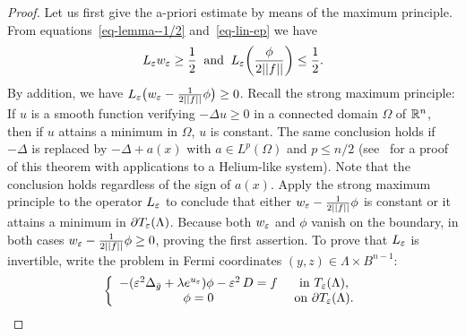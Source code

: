 \begin{proof} Let us first give the a-priori estimate by means of the maximum
    principle. From equations~\ref{eq-lemma--1/2} and~\ref{eq-lin-ep} we have
    \begin{equation}
        L_\varepsilon w_\varepsilon \geq \frac{1}{2}\;\;\mbox{and}\;\;
        L_\varepsilon\bigg(\frac{\phi}{2||f||}\bigg)\leq \frac{1}{2}.
    \end{equation}
    By addition, we have $L_\varepsilon\big(w_\varepsilon-\frac{1}{2||f||}\phi\big)\geq 0$.
    Recall the strong maximum principle: If $u$ is a smooth function verifying
    $-\Delta u\geq 0$ in a connected domain $\Omega$ of $\mathbb{R}^n$, then if $u$
    attains a minimum in $\Omega$, $u$ is constant. The same conclusion holds
    if $-\Delta$ is replaced by $-\Delta+a(x)$ with $a\in L^p(\Omega)$ and
    $p\leq n/2$ (see~\cite{hoffman-ostenhof} for a proof of this theorem with
    applications to a Helium-like system). Note that the conclusion holds
    regardless of the sign of $a(x)$. Apply the strong maximum principle to the
    operator $L_\varepsilon$ to conclude that either $w_\varepsilon-\frac{1}{2||f||}\phi$ is
    constant or it attains a minimum in $\partial T_\varepsilon(\Lambda)$. Because both
    $w_\varepsilon$ and $\phi$ vanish on the boundary, in both cases
    $w_\varepsilon-\frac{1}{2||f||}\phi\geq 0$, proving the first assertion.
    To prove that $L_\varepsilon$ is invertible, write the
    problem in Fermi coordinates $(y,z)\in\Lambda\times B^{n-1}$:
    \begin{equation}
        \left\{
            \begin{array}{cc}
                -(\varepsilon^2 \Delta_{\bar g}+\lambda e^{u_\varepsilon})\phi - \varepsilon^2\, D=f & \mbox{ in }T_\varepsilon(\Lambda),\\
                \phi=0 & \mbox{ on }\partial T_\varepsilon(\Lambda).
            \end{array}
        \right.
    \end{equation}


\end{proof}
